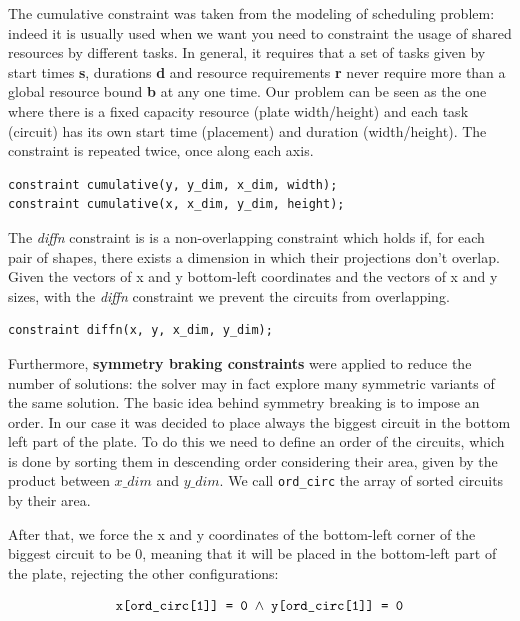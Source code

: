 The cumulative constraint was taken from the modeling of scheduling problem: indeed it is usually used when we want you need to constraint the usage of shared resources by different tasks. In general, it requires that a set of tasks given by start times \textbf{s}, durations \textbf{d}  and resource requirements \textbf{r} never require more than a global resource bound \textbf{b} at any one time. 
Our problem can be seen as the one where there is a fixed capacity resource (plate width/height) and each task (circuit) has its own start time (placement) and duration (width/height). The constraint is repeated twice, once along each axis.

\begin{verbatim}
constraint cumulative(y, y_dim, x_dim, width); 
constraint cumulative(x, x_dim, y_dim, height);
\end{verbatim}

The \textit{diffn} constraint is is a non-overlapping constraint which holds if, for each pair of shapes, there exists a dimension in which their projections don't overlap. Given the vectors of x and y bottom-left coordinates and the vectors of x and y sizes, with the \textit{diffn} constraint we prevent the circuits from overlapping.

\begin{verbatim}
constraint diffn(x, y, x_dim, y_dim); 
\end{verbatim}


Furthermore, \textbf{symmetry braking constraints} were applied to reduce the number of solutions: the solver may in fact explore many symmetric variants of the same solution. The basic idea behind symmetry breaking is to impose an order.
In our case it was decided to place always the biggest circuit in the bottom left part of the plate. To do this we need to define an order of the circuits, which is done by sorting them in descending order considering their area, given by the product between $x\_dim$ and $y\_dim$. We call \verb|ord_circ| the array of sorted circuits by their area. 

After that, we force the x and y coordinates of the bottom-left corner of the biggest circuit to be 0, meaning that it will be placed in the bottom-left part of the plate, rejecting the other configurations:

\begin{equation}
    \verb|x[ord_circ[1]] = 0| \; \land \; \verb|y[ord_circ[1]] = 0|
\end{equation}

